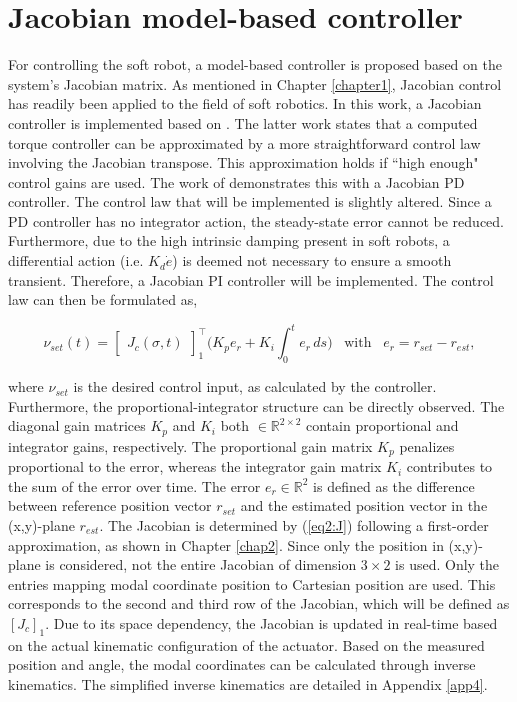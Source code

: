 \section{Jacobian model-based controller}


For controlling the soft robot, a model-based controller is proposed based on the system's Jacobian matrix. As mentioned in Chapter \ref{chapter1}, Jacobian control has readily been applied to the field of soft robotics. In this work, a Jacobian controller is implemented based on \cite{MOOSAVIAN20071226}. The latter work states that a computed torque controller can be approximated by a more straightforward control law involving the Jacobian transpose. This approximation holds if ``high enough" control gains are used. The work of \cite{MOOSAVIAN20071226} demonstrates this with a Jacobian PD controller. The control law that will be implemented is slightly altered. Since a PD controller has no integrator action, the steady-state error cannot be reduced. Furthermore, due to the high intrinsic damping present in soft robots, a differential action (i.e. $K_d \dot{e}$) is deemed not necessary to ensure a smooth transient. Therefore, a Jacobian PI controller will be implemented. The control law can then be formulated as,


\begin{equation}
    \nu_{set}(t) = \begin{bmatrix}J_c(\sigma,t)\end{bmatrix}_1^\top \Big(K_p e_r + K_i \int_0^t e_r \hspace{2pt} ds \Big) \hspace{10pt} \text{with} \hspace{10pt} e_r = r_{set}-r_{est}, 
    \label{eq:tau}
\end{equation}

where $\nu_{set}$ is the desired control input, as calculated by the controller. Furthermore, the proportional-integrator structure can be directly observed. The diagonal gain matrices $K_p$ and $K_i$ both  $ \in \mathbb{R}^{2\times 2}$ contain proportional and integrator gains, respectively. The proportional gain matrix $K_p$ penalizes proportional to the error, whereas the integrator gain matrix $K_i$ contributes to the sum of the error over time. The error $e_r \in \mathbb{R}^2$ is defined as the difference between reference position vector $r_{set}$ and the estimated position vector in the (x,y)-plane $r_{est}$. The Jacobian is determined by (\ref{eq2:J}) following a first-order approximation, as shown in Chapter \ref{chap2}. Since only the position in (x,y)-plane is considered, not the entire Jacobian of dimension $3 \times 2$ is used. Only the entries mapping modal coordinate position to Cartesian position are used. This corresponds to the second and third row of the Jacobian, which will be defined as $[J_c]_1$. Due to its space dependency, the Jacobian is updated in real-time based on the actual kinematic configuration of the actuator. Based on the measured position and angle, the modal coordinates can be calculated through inverse kinematics. The simplified inverse kinematics are detailed in Appendix \ref{app4}.

